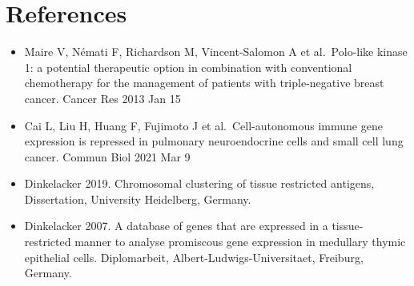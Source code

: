 \documentclass[
]{article}
\providecommand{\tightlist}{%
  \setlength{\itemsep}{0pt}\setlength{\parskip}{0pt}}
\begin{document}
\hypertarget{references}{%
\section{References}\label{references}}

\begin{itemize}
\tightlist
\item
  Maire V, Némati F, Richardson M, Vincent-Salomon A et al.~Polo-like
  kinase 1: a potential therapeutic option in combination with
  conventional chemotherapy for the management of patients with
  triple-negative breast cancer. Cancer Res 2013 Jan 15
\item
  Cai L, Liu H, Huang F, Fujimoto J et al.~Cell-autonomous immune gene
  expression is repressed in pulmonary neuroendocrine cells and small
  cell lung cancer. Commun Biol 2021 Mar 9
\item
  Dinkelacker 2019. Chromosomal clustering of tissue restricted
  antigens, Dissertation, University Heidelberg, Germany.
\item
  Dinkelacker 2007. A database of genes that are expressed in a
  tissue-restricted manner to analyse promiscous gene expression in
  medullary thymic epithelial cells. Diplomarbeit,
  Albert-Ludwigs-Universitaet, Freiburg, Germany.
\end{itemize}
\end{document}
